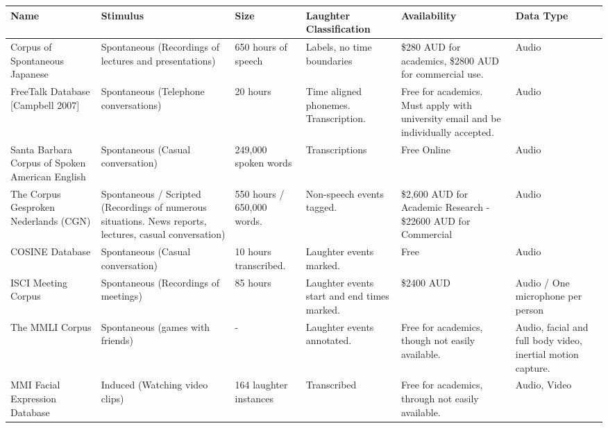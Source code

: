 \documentclass[a4paper,11pt,notitlepage]{article}
\begin{document}
\begin{landscape}
\renewcommand\arraystretch{1.5}
\begin{longtable}{|p{3cm}|p{4cm}|p{2cm}|p{3cm}|p{3.5cm}|p{3cm}|}
\hline
\textbf{Name} & \textbf{Stimulus} & \textbf{Size} & \textbf{Laughter Classification} & \textbf{Availability} & \textbf{Data Type} \\ \hline \hline
Corpus of Spontaneous Japanese & Spontaneous (Recordings of lectures and presentations) & 650 hours of speech & Labels, no time boundaries & \$280 AUD for academics, \$2800 AUD for commercial use. & Audio \\ \hline

FreeTalk Database {[}Campbell 2007{]} & Spontaneous (Telephone conversations) & 20 hours & Time aligned phonemes. Transcription. & Free for academics. Must apply with university email and be individually accepted. & Audio \\ \hline

Santa Barbara Corpus of Spoken American English & Spontaneous (Casual conversation) & 249,000 spoken words & Transcriptions & Free Online & Audio \\ \hline

The Corpus Gesproken Nederlands (CGN) & Spontaneous / Scripted (Recordings of numerous situations. News reports, lectures, casual conversation) & 550 hours / 650,000 words. & Non-speech events tagged. & \$2,600 AUD for Academic Research - \$22600 AUD for Commercial & Audio \\ \hline

COSINE Database & Spontaneous (Casual conversation) & 10 hours transcribed. & Laughter events marked. & Free & Audio \\ \hline

ISCI Meeting Corpus & Spontaneous (Recordings of meetings) & 85 hours & Laughter events start and end times marked. & \$2400 AUD & Audio / One microphone per person \\ \hline

The MMLI Corpus & Spontaneous (games with friends) & - & Laughter events annotated. & Free for academics, though not easily available. & Audio, facial and full body video, inertial motion capture. \\ \hline

MMI Facial Expression Database & Induced (Watching video clips) & 164 laughter instances & Transcribed & Free for academics, through not easily available. & Audio, Video \\ \hline


\end{longtable}
\end{landscape}
\end{document}
